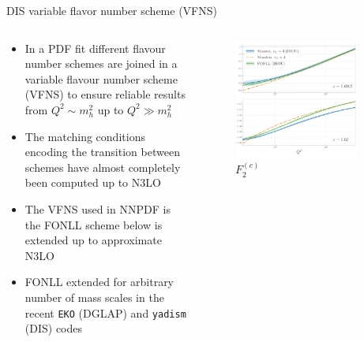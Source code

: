 \documentclass[aspectratio=169, 9pt,t]{beamer}
\begin{document}
\begin{frame}{DIS variable flavor number scheme (VFNS)}
  \begin{columns}
    \begin{column}{0.59\textwidth}
      \begin{itemize}
        \item In a PDF fit different flavour number schemes are joined in a variable flavour number scheme (VFNS) to ensure reliable results from $Q^2\sim m_h^2$ up to $Q^2\gg m_h^2$
        \item The matching conditions encoding the transition between schemes have almost completely been computed up to N3LO
        \item The VFNS used in NNPDF is the FONLL scheme below is extended up to approximate N3LO
        \item FONLL extended for arbitrary number of mass scales in the recent \texttt{EKO} (DGLAP) and \texttt{yadism} (DIS) codes
      \end{itemize}
    \end{column}
    \begin{column}{0.39\textwidth}
      \vspace*{-2em}
      \begin{figure}[!t]
        \centering
        \includegraphics[width=0.89\textwidth]{figures/F2_charm_n3lo.pdf}
        \caption*{$F_2^{(c)}$}
      \end{figure}
    \end{column}
  \end{columns}


\end{frame}
\end{document}
